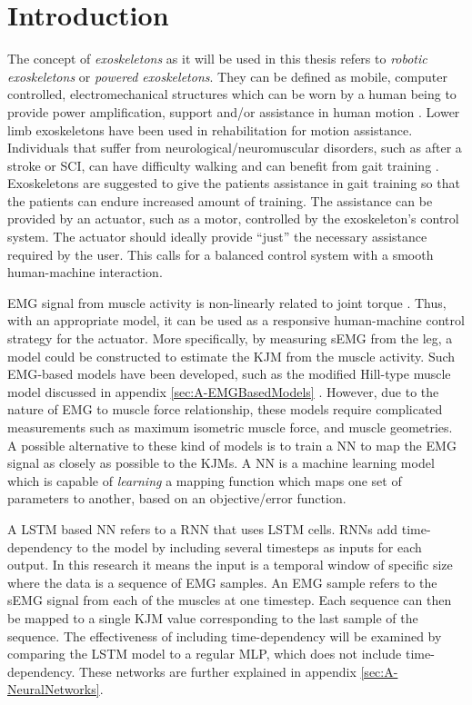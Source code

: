 \documentclass[../main.tex]{subfiles}
\begin{document}
\chapter{Introduction}
The concept of \textit{exoskeletons} as it will be used in this thesis refers to \textit{robotic exoskeletons} or \textit{powered exoskeletons}. 
They can be defined as mobile, computer controlled, electromechanical structures which can be worn by a human being to provide power amplification, support and/or assistance in human motion \cite{Anam2012, Gorgey2018}. 
Lower limb exoskeletons have been used in rehabilitation for motion assistance.
Individuals that suffer from neurological/neuromuscular disorders, such as after a stroke or \ac{SCI}, can have difficulty walking and can benefit from gait training \cite{Gorgey2018, Young2017, Lerner2017}.
Exoskeletons are suggested to give the patients assistance in gait training so that the patients can endure increased amount of training.
The assistance can be provided by an actuator, such as a motor, controlled by the exoskeleton's control system.
The actuator should ideally provide ``just'' the necessary assistance required by the user.
This calls for a balanced control system with a smooth human-machine interaction.

\Ac{EMG} signal from muscle activity is non-linearly related to joint torque \cite{Young2017}.
Thus, with an appropriate model, it can be used as a responsive human-machine control strategy for the actuator.
More specifically, by measuring \ac{sEMG} from the leg, a model could be constructed to estimate the \ac{KJM} from the muscle activity.
Such \ac{EMG}-based models have been developed, such as the modified Hill-type muscle model discussed in appendix \ref{sec:A-EMGBasedModels} \cite{Pizzolato2015, Erdemir2007, Lloyd2003}.
However, due to the nature of \ac{EMG} to muscle force relationship, these models require complicated measurements such as maximum isometric muscle force, and muscle geometries.
A possible alternative to these kind of models is to train a \ac{NN} to map the \ac{EMG} signal as closely as possible to the \acp{KJM}.
A \ac{NN} is a machine learning model which is capable of \textit{learning} a mapping function which maps one set of parameters to another, based on an objective/error function. 

A \ac{LSTM} based \ac{NN} refers to a \ac{RNN} that uses \ac{LSTM} cells.
\acp{RNN} add time-dependency to the model by including several timesteps as inputs for each output.
In this research it means the input is a temporal window of specific size where the data is a sequence of \ac{EMG} samples.
An \ac{EMG} sample refers to the \ac{sEMG} signal from each of the muscles at one timestep.
Each sequence can then be mapped to a single \ac{KJM} value corresponding to the last sample of the sequence.
The effectiveness of including time-dependency will be examined by comparing the \ac{LSTM} model to a regular \ac{MLP}, which does not include time-dependency.
These networks are further explained in appendix \ref{sec:A-NeuralNetworks}.
\end{document}
